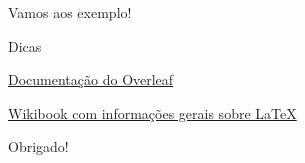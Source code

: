 \documentclass[aspectratio=169,xcolor=dvipsnames]{beamer}
\begin{document}
\begin{frame}
\Huge{\centerline{Vamos aos exemplo!}}
\end{frame}

\begin{frame}{Dicas}

    \href{https://pt.overleaf.com/learn}{Documentação do Overleaf}
    
    
    \href{https://en.wikibooks.org/wiki/LaTeX/Document_Structure}{Wikibook com informações gerais sobre \LaTeX}

    
\end{frame}

\begin{frame}
    \Huge{\centerline{Obrigado!}} 
\end{frame}
\end{document}
